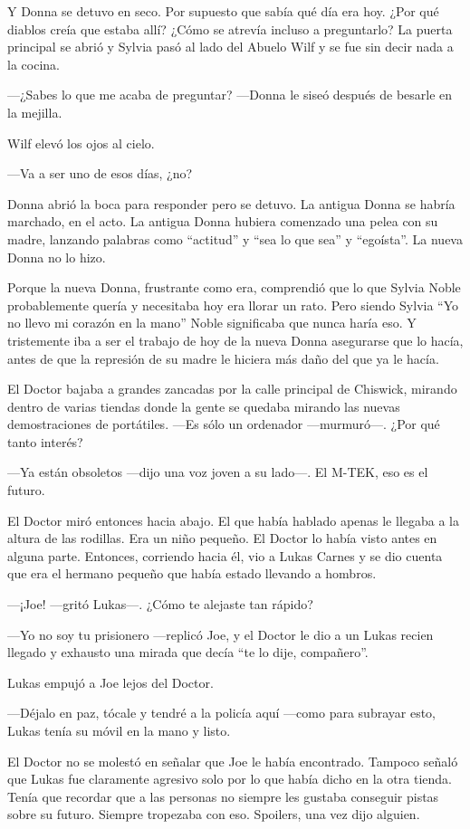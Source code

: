 Y Donna se detuvo en seco. Por supuesto que sabía qué día era hoy. ¿Por
qué diablos creía que estaba allí? ¿Cómo se atrevía incluso a
preguntarlo? La puerta principal se abrió y Sylvia pasó al lado del
Abuelo Wilf y se fue sin decir nada a la cocina.

---¿Sabes lo que me acaba de preguntar? ---Donna le siseó después de
besarle en la mejilla.

Wilf elevó los ojos al cielo.

---Va a ser uno de esos días, ¿no?

Donna abrió la boca para responder pero se detuvo. La antigua Donna se
habría marchado, en el acto. La antigua Donna hubiera comenzado una
pelea con su madre, lanzando palabras como ``actitud'' y ``sea lo que
sea'' y ``egoísta''. La nueva Donna no lo hizo.

Porque la nueva Donna, frustrante como era, comprendió que lo que Sylvia
Noble probablemente quería y necesitaba hoy era llorar un rato. Pero
siendo Sylvia ``Yo no llevo mi corazón en la mano'' Noble significaba
que nunca haría eso. Y tristemente iba a ser el trabajo de hoy de la
nueva Donna asegurarse que lo hacía, antes de que la represión de su
madre le hiciera más daño del que ya le hacía.

El Doctor bajaba a grandes zancadas por la calle principal de Chiswick,
mirando dentro de varias tiendas donde la gente se quedaba mirando las
nuevas demostraciones de portátiles. ---Es sólo un ordenador
---murmuró---. ¿Por qué tanto interés?

---Ya están obsoletos ---dijo una voz joven a su lado---. El M-TEK, eso
es el futuro.

El Doctor miró entonces hacia abajo. El que había hablado apenas le
llegaba a la altura de las rodillas. Era un niño pequeño. El Doctor lo
había visto antes en alguna parte. Entonces, corriendo hacia él, vio a
Lukas Carnes y se dio cuenta que era el hermano pequeño que había estado
llevando a hombros.

---¡Joe! ---gritó Lukas---. ¿Cómo te alejaste tan rápido?

---Yo no soy tu prisionero ---replicó Joe, y el Doctor le dio a un Lukas
recien llegado y exhausto una mirada que decía ``te lo dije,
compañero''.

Lukas empujó a Joe lejos del Doctor.

---Déjalo en paz, tócale y tendré a la policía aquí ---como para
subrayar esto, Lukas tenía su móvil en la mano y listo.

El Doctor no se molestó en señalar que Joe le había encontrado. Tampoco
señaló que Lukas fue claramente agresivo solo por lo que había dicho en
la otra tienda. Tenía que recordar que a las personas no siempre les
gustaba conseguir pistas sobre su futuro. Siempre tropezaba con eso.
Spoilers, una vez dijo alguien.

